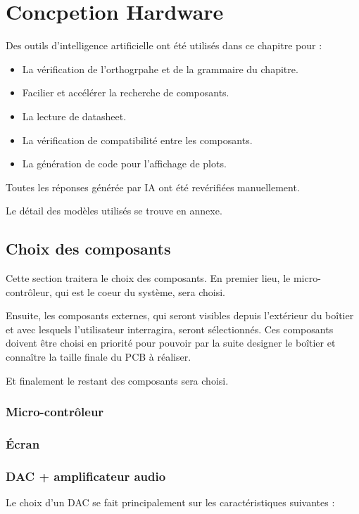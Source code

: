 \chapter{Concpetion Hardware}

Des outils d'intelligence artificielle ont été utilisés dans ce chapitre pour :
\begin{itemize}
    \item La vérification de l'orthogrpahe et de la grammaire du chapitre.
    \item Facilier et accélérer la recherche de composants.
    \item La lecture de datasheet.
    \item La vérification de compatibilité entre les composants.
    \item La génération de code pour l'affichage de plots.
\end{itemize}
Toutes les réponses générée par IA ont été revérifiées manuellement.

Le détail des modèles utilisés se trouve en annexe. \\

\section{Choix des composants}

Cette section traitera le choix des composants. En premier lieu, le micro-contrôleur, qui est le coeur du système, sera choisi.

Ensuite, les composants externes, qui seront visibles depuis l'extérieur du boîtier et avec lesquels l'utilisateur interragira, seront sélectionnés.
Ces composants doivent être choisi en priorité pour pouvoir par la suite designer le boîtier et connaître la taille finale du PCB à réaliser.

Et finalement le restant des composants sera choisi. \\

\subsection{Micro-contrôleur}

\subsection{Écran}

\subsection{DAC + amplificateur audio}
Le choix d'un DAC se fait principalement sur les caractéristiques suivantes :

